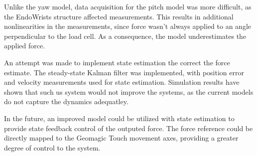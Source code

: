 Unlike the yaw model, data acquisition for the pitch model was more difficult, as the EndoWrists structure affected measurements.
This results in additional nonlinearities in the measurements, since force wasn't always applied to an angle perpendicular to the load cell.
As a consequence, the model underestimates the applied force.

An attempt was made to implement state estimation the correct the force estimate.
The steady-state Kalman filter was implemented, with position error and velocity measurements used for state estimation.
Simulation results have shown that such us system would not improve the systems, as the current models do not capture the dynamics adequatley.

In the future, an improved model could be utilized with state estimation to provide state feedback control of the outputed force.
The force reference could be directly mapped to the Geomagic Touch movement axes, providing a greater degree of control to the system.














